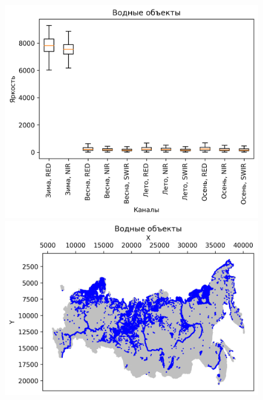 \documentclass[14pt, a4paper, oneside]{extarticle}
\begin{document}
\begin{figure}[H]
    \centering
    \includegraphics[]{class-20-boxplot}
    \includegraphics[]{class-20-map}
\end{figure}
\end{document}
